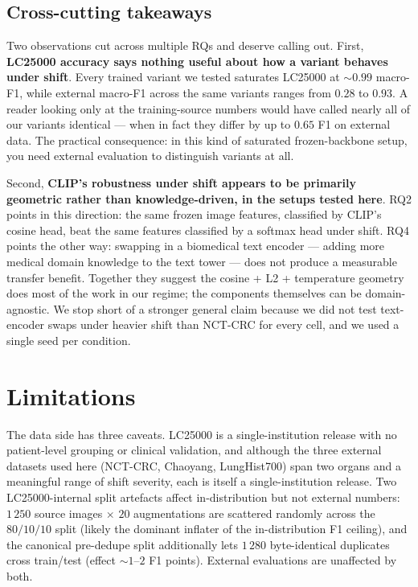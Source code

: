 \subsection*{Cross-cutting takeaways}

Two observations cut across multiple RQs and deserve calling out. First, \textbf{LC25000 accuracy says nothing useful about how a variant behaves under shift}. Every trained variant we tested saturates LC25000 at $\sim 0.99$ macro-F1, while external macro-F1 across the same variants ranges from $0.28$ to $0.93$. A reader looking only at the training-source numbers would have called nearly all of our variants identical --- when in fact they differ by up to $0.65$ F1 on external data. The practical consequence: in this kind of saturated frozen-backbone setup, you need external evaluation to distinguish variants at all.

Second, \textbf{CLIP's robustness under shift appears to be primarily geometric rather than knowledge-driven, in the setups tested here}. RQ2 points in this direction: the same frozen image features, classified by CLIP's cosine head, beat the same features classified by a softmax head under shift. RQ4 points the other way: swapping in a biomedical text encoder --- adding more medical domain knowledge to the text tower --- does not produce a measurable transfer benefit. Together they suggest the cosine + L2 + temperature geometry does most of the work in our regime; the components themselves can be domain-agnostic. We stop short of a stronger general claim because we did not test text-encoder swaps under heavier shift than NCT-CRC for every cell, and we used a single seed per condition.


\section{Limitations}
\label{sec:concl-limitations}

The data side has three caveats. LC25000 is a single-institution release with no patient-level grouping or clinical validation, and although the three external datasets used here (NCT-CRC, Chaoyang, LungHist700) span two organs and a meaningful range of shift severity, each is itself a single-institution release. Two LC25000-internal split artefacts affect in-distribution but not external numbers: $1\,250$ source images $\times$ $20$ augmentations are scattered randomly across the $80/10/10$ split (likely the dominant inflater of the in-distribution F1 ceiling), and the canonical pre-dedupe split additionally lets $1\,280$ byte-identical duplicates cross train/test (effect $\sim 1$--$2$ F1 points). External evaluations are unaffected by both.


